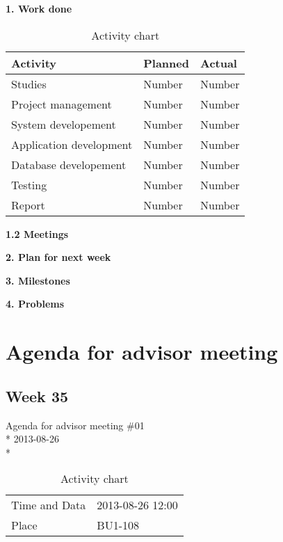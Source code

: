 \textbf{1. Work done}

\begin{table}[H]
\begin{center}
\begin{tabular}{ l | l | l }
  \hline
  Activity & Planned & Actual \\
  \hline\noalign{\smallskip}\noalign{\smallskip}\hline
  Studies & Number & Number \\
  Project management & Number & Number \\
  System developement & Number & Number \\
  Application development & Number & Number \\
  Database developement & Number & Number \\
  Testing & Number & Number \\
  Report & Number & Number \\
  \hline
\end{tabular}
\end{center}
\caption{Activity chart}
\label{table:activityChartStatusReport}
\end{table}

\textbf{1.2 Meetings}

\textbf{2. Plan for next week}

\textbf{3. Milestones}

\textbf{4. Problems}


\newpage

\section{Agenda for advisor meeting}
\subsection{Week 35}

\begin{center}
Agenda for advisor meeting \#01\\*
2013-08-26\\*
\end{center}

\begin{table}[H]
\begin{center}
\begin{tabular}{ l | l }
Time and Data & 2013-08-26 12:00 \\
Place & BU1-108 \\
\end{tabular}
\end{center}
\caption{Activity chart}
\label{table:activityChartAdvisorAgendaWeek35}
\end{table}

